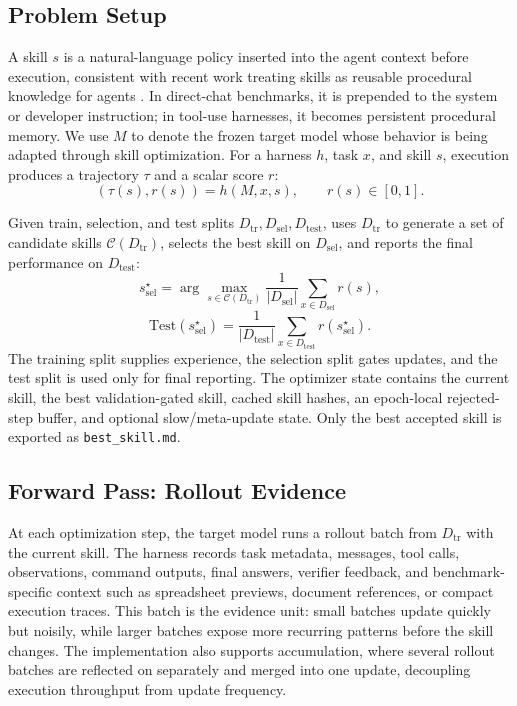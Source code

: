 \subsection{Problem Setup}
\label{sec:method_skill}

A skill $s$ is a natural-language policy inserted into the agent context before execution, consistent with recent work treating skills as reusable procedural knowledge for agents \citep{li2026skillsbench,jiang2026sok}. In direct-chat benchmarks, it is prepended to the system or developer instruction; in tool-use harnesses, it becomes persistent procedural memory. We use $M$ to denote the frozen target model whose behavior is being adapted through skill optimization. For a harness $h$, task $x$, and skill $s$, execution produces a trajectory $\tau$ and a scalar score $r$:
\begin{equation}
    (\tau(s), r(s)) = h(M, x, s), \qquad r(s) \in [0,1].
\end{equation}

Given train, selection, and test splits $D_{\mathrm{tr}},D_{\mathrm{sel}},D_{\mathrm{test}}$, \ourmethod{} uses $D_{\mathrm{tr}}$ to generate a set of candidate skills $\mathcal{C}(D_{\mathrm{tr}})$, selects the best skill on $D_{\mathrm{sel}}$, and reports the final performance on $D_{\mathrm{test}}$:
\begin{equation}
    s^\star_{\mathrm{sel}}
    =
    \arg\max_{s \in \mathcal{C}(D_{\mathrm{tr}})}
    \frac{1}{|D_{\mathrm{sel}}|}
    \sum_{x \in D_{\mathrm{sel}}}
    r(s),
\end{equation}
\begin{equation}
    \mathrm{Test}(s^\star_{\mathrm{sel}})
    =
    \frac{1}{|D_{\mathrm{test}}|}
    \sum_{x \in D_{\mathrm{test}}}
    r(s^\star_{\mathrm{sel}}).
\end{equation}
The training split supplies experience, the selection split gates updates, and the test split is used only for final reporting. The optimizer state contains the current skill, the best validation-gated skill, cached skill hashes, an epoch-local rejected-step buffer, and optional slow/meta-update state. Only the best accepted skill is exported as \texttt{best\_skill.md}.

\subsection{Forward Pass: Rollout Evidence}
\label{sec:method_forward}

At each optimization step, the target model runs a rollout batch from $D_{\mathrm{tr}}$ with the current skill. The harness records task metadata, messages, tool calls, observations, command outputs, final answers, verifier feedback, and benchmark-specific context such as spreadsheet previews, document references, or compact execution traces. This batch is the evidence unit: small batches update quickly but noisily, while larger batches expose more recurring patterns before the skill changes. The implementation also supports accumulation, where several rollout batches are reflected on separately and merged into one update, decoupling execution throughput from update frequency.

